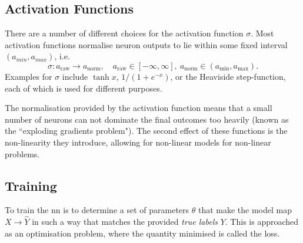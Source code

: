 
        \subsection{Activation Functions \label{ssec: activation function}}

        There are a number of different choices for the activation function $\sigma$. Most activation functions normalise \gls{neuron} outputs to lie within some fixed interval $(a_{min}, a_{max})$, i.e.
        \begin{equation}
        \sigma : a_{\text{raw}} \rightarrow a_{\text{norm}}, \quad a_{\text{raw}} \in [-\infty, \infty], \: a_{\text{norm}} \in (a_{\text{min}}, a_{\text{max}}).
        \end{equation}
        Examples for $\sigma$ include $\tanh{x}$, $1/(1 + e^{-x})$, or the Heaviside step-function, each of which is used for different purposes\cite{mlTextbook}.

        The normalisation provided by the activation function means that a small number of \glspl{neuron} can not dominate the final outcomes too heavily (known as the ``exploding gradients problem"). The second effect of these functions is the non-linearity they introduce, allowing for non-linear \glspl{model} for non-linear problems\cite{mlTextbook}.

    \subsection{Training \label{ssec: training}}
        To train the \gls{nn} is to determine a set of parameters $\theta$ that make the \gls{model} map $X \rightarrow \hat{Y}$ in such a way that matches the provided \textit{true labels} $Y$. This is approached as an optimisation problem, where the quantity minimised is called the loss\cite{mlTextbook}.

